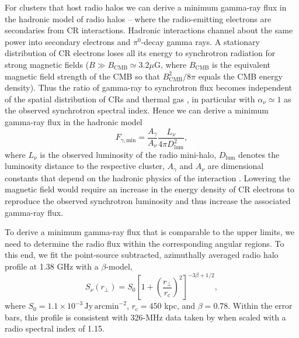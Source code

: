 \documentclass[12pt,manuscript]{aastex}
\newcommand{\rmn}{\mathrm}
\newcommand{\dps}{\displaystyle}
\begin{document}
For clusters that host radio halos we can derive a minimum gamma-ray flux in the hadronic model of
radio halos -- where the radio-emitting electrons are secondaries from CR interactions.  Hadronic
interactions channel about the same power into secondary electrons and $\pi^{0}$-decay gamma rays. A
stationary distribution of CR electrons loses all its energy to synchrotron radiation for strong
magnetic fields ($B \gg B_\rmn{CMB} \simeq 3.2 \mu$G, where $B_\rmn{CMB}$ is the equivalent magnetic
field strength of the CMB so that $B_\rmn{CMB}^2/8\pi$ equals the CMB energy density). Thus the
ratio of gamma-ray to synchrotron flux becomes independent of the spatial distribution of CRs and
thermal gas \citep{article:Voelk:1989, article:Pohl:1994, article:Pfrommer:2008}, in particular with
$\alpha_{\nu}\simeq 1$ as the observed synchrotron spectral index.  Hence we can derive a minimum
gamma-ray flux in the hadronic model
\begin{equation}
\label{eq:Fmin}
F_{\gamma,\rmn{min}} = \frac{\dps A_{\gamma}}{\dps A_{\nu}}\frac{\dps L_{\nu}}{\dps 4\pi D_{\rmn{lum}}^{2}},
\end{equation}
where $L_{\nu}$ is the observed luminosity of the radio mini-halo, $D_{\rmn{lum}}$ denotes the
luminosity distance to the respective cluster, $A_\gamma$ and $A_\nu$ are dimensional constants
that depend on the hadronic physics of the interaction \citep{article:Pfrommer:2008,
Pfrommer_etal:2008}. Lowering the magnetic field would require an increase in the energy density of
CR electrons to reproduce the observed synchrotron luminosity and thus increase the associated
gamma-ray flux.

To derive a minimum gamma-ray flux that is comparable to the upper limits, we need to determine the
radio flux within the corresponding angular regions. To this end, we fit the point-source
subtracted, azimuthally averaged radio halo profile at 1.38 GHz \citep{article:Deiss_etal:1997}
with a $\beta$-model,
\begin{equation}
\label{beta}
 S_{\nu} (r_{\bot})= S_{0} \left[ 1 + \left( \frac{r_{\bot}}{r_{\rmn{c}}}\right)^{2}\right]^{-3\beta + 1/2},
\end{equation}
where $S_{0} = 1.1 \times 10^{-3}\,\rmn{Jy\,arcmin}^{-2}$, $r_{\rmn{c}} = 450$ kpc, and
$\beta = 0.78$.  Within the error bars, this profile is consistent with 326-MHz data taken by
\citet{article:Govoni_etal:2001} when scaled with a radio spectral index of 1.15. 
\end{document}
